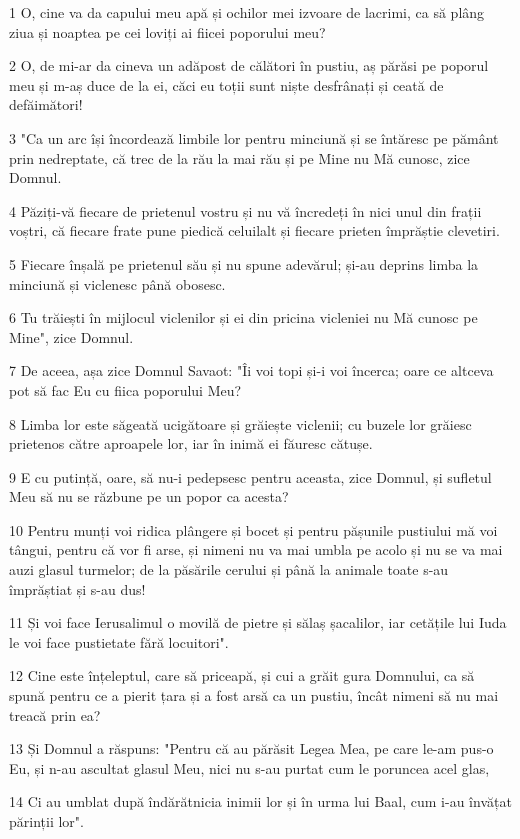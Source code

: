 \par 1 O, cine va da capului meu apă și ochilor mei izvoare de lacrimi, ca să plâng ziua și noaptea pe cei loviți ai fiicei poporului meu?
\par 2 O, de mi-ar da cineva un adăpost de călători în pustiu, aș părăsi pe poporul meu și m-aș duce de la ei, căci eu toții sunt niște desfrânați și ceată de defăimători!
\par 3 "Ca un arc își încordează limbile lor pentru minciună și se întăresc pe pământ prin nedreptate, că trec de la rău la mai rău și pe Mine nu Mă cunosc, zice Domnul.
\par 4 Păziți-vă fiecare de prietenul vostru și nu vă încredeți în nici unul din frații voștri, că fiecare frate pune piedică celuilalt și fiecare prieten împrăștie clevetiri.
\par 5 Fiecare înșală pe prietenul său și nu spune adevărul; și-au deprins limba la minciună și viclenesc până obosesc.
\par 6 Tu trăiești în mijlocul viclenilor și ei din pricina vicleniei nu Mă cunosc pe Mine", zice Domnul.
\par 7 De aceea, așa zice Domnul Savaot: "Îi voi topi și-i voi încerca; oare ce altceva pot să fac Eu cu fiica poporului Meu?
\par 8 Limba lor este săgeată ucigătoare și grăiește viclenii; cu buzele lor grăiesc prietenos către aproapele lor, iar în inimă ei făuresc cătușe.
\par 9 E cu putință, oare, să nu-i pedepsesc pentru aceasta, zice Domnul, și sufletul Meu să nu se răzbune pe un popor ca acesta?
\par 10 Pentru munți voi ridica plângere și bocet și pentru pășunile pustiului mă voi tângui, pentru că vor fi arse, și nimeni nu va mai umbla pe acolo și nu se va mai auzi glasul turmelor; de la păsările cerului și până la animale toate s-au împrăștiat și s-au dus!
\par 11 Și voi face Ierusalimul o movilă de pietre și sălaș șacalilor, iar cetățile lui Iuda le voi face pustietate fără locuitori".
\par 12 Cine este înțeleptul, care să priceapă, și cui a grăit gura Domnului, ca să spună pentru ce a pierit țara și a fost arsă ca un pustiu, încât nimeni să nu mai treacă prin ea?
\par 13 Și Domnul a răspuns: "Pentru că au părăsit Legea Mea, pe care le-am pus-o Eu, și n-au ascultat glasul Meu, nici nu s-au purtat cum le poruncea acel glas,
\par 14 Ci au umblat după îndărătnicia inimii lor și în urma lui Baal, cum i-au învățat părinții lor".
